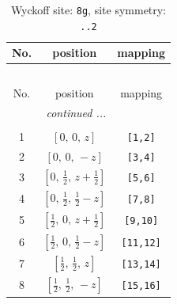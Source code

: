 \documentclass[fleqn,8pt]{jsarticle}
\begin{document}
\begin{longtable}{ccc}
\caption{Wyckoff site: {\tt 8g}, site symmetry: {\tt ..2}}
 \\
 \hline \hline
No. & position & mapping \\ \hline \endfirsthead

\multicolumn{2}{l}{\tablename\ \thetable{}} \\
 \hline \hline
No. & position & mapping \\ \hline \endhead

 \hline \hline
\multicolumn{2}{r}{\footnotesize\it continued ...} \\ \endfoot

 \hline \hline
\multicolumn{2}{r}{} \\ \endlastfoot

1 & $\left[ 0,\, 0,\, z \right]$ & {\tt [1,2]} \\ \hline
2 & $\left[ 0,\, 0,\, - z \right]$ & {\tt [3,4]} \\ \hline
3 & $\left[ 0,\, \frac{1}{2},\, z + \frac{1}{2} \right]$ & {\tt [5,6]} \\ \hline
4 & $\left[ 0,\, \frac{1}{2},\, \frac{1}{2} - z \right]$ & {\tt [7,8]} \\ \hline
5 & $\left[ \frac{1}{2},\, 0,\, z + \frac{1}{2} \right]$ & {\tt [9,10]} \\ \hline
6 & $\left[ \frac{1}{2},\, 0,\, \frac{1}{2} - z \right]$ & {\tt [11,12]} \\ \hline
7 & $\left[ \frac{1}{2},\, \frac{1}{2},\, z \right]$ & {\tt [13,14]} \\ \hline
8 & $\left[ \frac{1}{2},\, \frac{1}{2},\, - z \right]$ & {\tt [15,16]} \\
\end{longtable}
\renewcommand{\arraystretch}{1.2}
\end{document}
